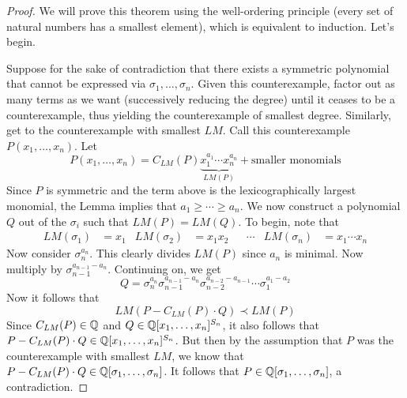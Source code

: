 \documentclass[../notes.tex]{subfiles}
\begin{document}
\begin{itemize}
\begin{proof}


        We will prove this theorem using the well-ordering principle (every set of natural numbers has a smallest element), which is equivalent to induction. Let's begin.\par
        Suppose for the sake of contradiction that there exists a symmetric polynomial that cannot be expressed via $\sigma_1,\dots,\sigma_n$. Given this counterexample, factor out as many terms as we want (successively reducing the degree) until it ceases to be a counterexample, thus yielding the counterexample of smallest degree. Similarly, get to the counterexample with smallest $LM$. Call this counterexample $P(x_1,\dots,x_n)$. Let
        \begin{equation*}
            P(x_1,\dots,x_n) = C_{LM}(P)\underbrace{x_1^{a_1}\cdots x_n^{a_n}}_{LM(P)}+\text{smaller monomials}
        \end{equation*}
        Since $P$ is symmetric and the term above is the lexicographically largest monomial, the Lemma implies that $a_1\geq\cdots\geq a_n$. We now construct a polynomial $Q$ out of the $\sigma_i$ such that $LM(P)=LM(Q)$. To begin, note that
        \begin{align*}
            LM(\sigma_1) &= x_1&
            LM(\sigma_2) &= x_1x_2&
            &\cdots&
            LM(\sigma_n) &= x_1\cdots x_n
        \end{align*}
        Now consider $\sigma_n^{a_n}$. This clearly divides $LM(P)$ since $a_n$ is minimal. Now multiply by $\sigma_{n-1}^{a_{n-1}-a_n}$. Continuing on, we get
        \begin{equation*}
            Q = \sigma_n^{a_n}\sigma_{n-1}^{a_{n-1}-a_n}\sigma_{n-2}^{a_{n-2}-a_{n-1}}\cdots\sigma_1^{a_1-a_2}
        \end{equation*}
        Now it follows that
        \begin{equation*}
            LM(P-C_{LM}(P)\cdot Q) \prec LM(P)
        \end{equation*}
        Since $C_{LM}(P)\in\mathbb{Q}$ and $Q\in\mathbb{Q}[x_1,\dots,x_n]^{S_n}$, it also follows that $P-C_{LM}(P)\cdot Q\in\mathbb{Q}[x_1,\dots,x_n]^{S_n}$. But then by the assumption that $P$ was the counterexample with smallest $LM$, we know that $P-C_{LM}(P)\cdot Q\in\mathbb{Q}[\sigma_1,\dots,\sigma_n]$. It follows that $P\in\mathbb{Q}[\sigma_1,\dots,\sigma_n]$, a contradiction.

\end{proof}
\end{itemize}
\end{document}

